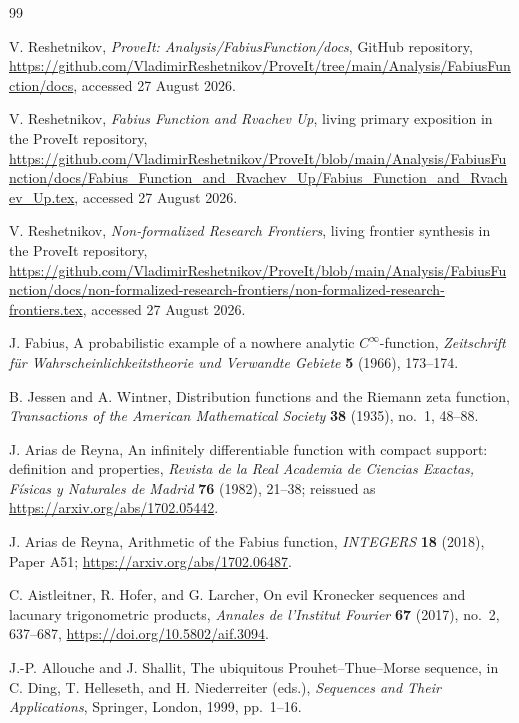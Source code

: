 \documentclass[11pt,oneside]{article}
\theoremstyle{definition}
\theoremstyle{remark}
\begin{document}
\begin{thebibliography}{99}

V. Reshetnikov,
\emph{ProveIt: Analysis/FabiusFunction/docs}, GitHub repository,
\url{https://github.com/VladimirReshetnikov/ProveIt/tree/main/Analysis/FabiusFunction/docs},
accessed 27 August 2026.

V. Reshetnikov,
\emph{Fabius Function and Rvachev Up}, living primary exposition in the ProveIt repository,
\url{https://github.com/VladimirReshetnikov/ProveIt/blob/main/Analysis/FabiusFunction/docs/Fabius_Function_and_Rvachev_Up/Fabius_Function_and_Rvachev_Up.tex},
accessed 27 August 2026.

V. Reshetnikov,
\emph{Non-formalized Research Frontiers}, living frontier synthesis in the ProveIt repository,
\url{https://github.com/VladimirReshetnikov/ProveIt/blob/main/Analysis/FabiusFunction/docs/non-formalized-research-frontiers/non-formalized-research-frontiers.tex},
accessed 27 August 2026.

J. Fabius,
A probabilistic example of a nowhere analytic $C^\infty$-function,
\emph{Zeitschrift f\"ur Wahrscheinlichkeitstheorie und Verwandte Gebiete}
\textbf{5} (1966), 173--174.

B. Jessen and A. Wintner,
Distribution functions and the Riemann zeta function,
\emph{Transactions of the American Mathematical Society}
\textbf{38} (1935), no.~1, 48--88.

J. Arias de Reyna,
An infinitely differentiable function with compact support: definition and properties,
\emph{Revista de la Real Academia de Ciencias Exactas, F\'isicas y Naturales de Madrid}
\textbf{76} (1982), 21--38;
reissued as \url{https://arxiv.org/abs/1702.05442}.

J. Arias de Reyna,
Arithmetic of the Fabius function,
\emph{INTEGERS} \textbf{18} (2018), Paper A51;
\url{https://arxiv.org/abs/1702.06487}.

C. Aistleitner, R. Hofer, and G. Larcher,
On evil Kronecker sequences and lacunary trigonometric products,
\emph{Annales de l'Institut Fourier} \textbf{67} (2017), no.~2, 637--687,
\url{https://doi.org/10.5802/aif.3094}.

J.-P. Allouche and J. Shallit,
The ubiquitous Prouhet--Thue--Morse sequence,
in C. Ding, T. Helleseth, and H. Niederreiter (eds.),
\emph{Sequences and Their Applications}, Springer, London, 1999, pp.~1--16.


\end{thebibliography}
\end{document}
